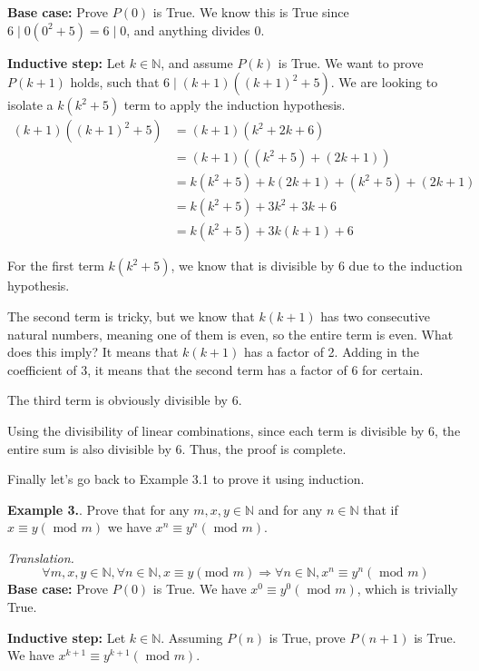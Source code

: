 \documentclass{article}
\newcounter{excount}
\newcommand\ex{\stepcounter{excount} \textbf{Example 3.\theexcount}. }
\begin{document}
\textbf{Base case:} Prove $P (0)$ is True. We know this is True since
$6 \mid 0 (0^2 + 5) = 6 \mid 0$, and anything divides 0.  

\textbf{Inductive step:} Let $k \in \mathbb{N}$, and assume $P(k)$ is True. 
We want to prove $P (k+1)$ holds, such that $ 6 \mid (k + 1) ((k+1)^2 + 5)$. 
We are looking to isolate a $k(k^2 +5)$ term to apply the induction 
hypothesis.
\begin{align*}
    (k+1) ( (k+1)^2 + 5) &= (k+1) (k^2 + 2k + 6) \\
                         &= (k+1) ((k^2 + 5) + (2k + 1)) \\
                        &= k(k^2 + 5) + k(2k + 1) + (k^2 + 5) + (2k + 1)\\
                        &= k(k^2 + 5) + 3k^2 + 3k  + 6 \\
                        &= k(k^2 + 5) + 3k(k+ 1) + 6 
\end{align*}

For the first term $k(k^2 +5)$, we know that is divisible by 6 due to the 
induction hypothesis. 

The second term is tricky, but we know that $k(k + 1)$
has two consecutive natural numbers, meaning one of them is even, so the 
entire term is even. What does this imply? It means that $ k(k+1)$ has a
factor of 2. Adding in the coefficient of 3, it means that the second term 
has a factor of 6 for certain. 

The third term is obviously divisible by 6. 

Using the divisibility of linear combinations, since each term is divisible 
by 6, the entire sum is also divisible by 6. Thus, the proof is complete.

Finally let's go back to Example 3.1 to prove it using induction.

\ex Prove that for any $m, x, y \in \mathbb{N}$ and for any $n \in \mathbb{N}$ 
that if $x \equiv y (\text{ mod } m)$ we have $x^n \equiv y^n (\text{ mod } m)$.

\textit{Translation.}
$$\forall m, x, y \in \mathbb{N}, \forall n \in \mathbb{N},  x \equiv y 
(\text{mod } m) \Rightarrow \forall n \in \mathbb{N}, x^n \equiv y^n 
(\text{ mod } m)$$
\textbf{Base case:} Prove $P (0)$ is True. We have $x^0 \equiv y^0 
(\text{ mod } m)$, which is trivially True.

\textbf{Inductive step:} Let $k \in \mathbb{N}$. Assuming $P(n)$ is True, 
prove $P(n+1)$ is True. We have $x^{k+1} \equiv y^{k+1} (\text{ mod } m)$. 
\end{document}
